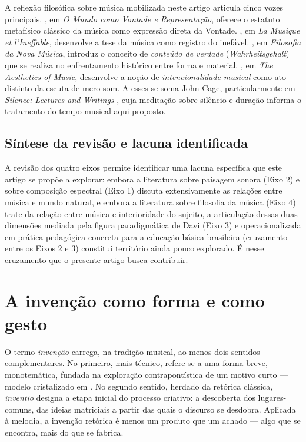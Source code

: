 \documentclass[12pt,a4paper]{article}
\begin{document}
A reflexão filosófica sobre música mobilizada neste artigo articula cinco vozes principais. \citet{Schopenhauer2005}, em \textit{O Mundo como Vontade e Representação}, oferece o estatuto metafísico clássico da música como expressão direta da Vontade. \citet{Jankelevitch1983}, em \textit{La Musique et l'Ineffable}, desenvolve a tese da música como registro do inefável. \citet{Adorno2018}, em \textit{Filosofia da Nova Música}, introduz o conceito de \textit{conteúdo de verdade} (\textit{Wahrheitsgehalt}) que se realiza no enfrentamento histórico entre forma e material. \citet{Scruton1997}, em \textit{The Aesthetics of Music}, desenvolve a noção de \textit{intencionalidade musical} como ato distinto da escuta de mero som. A esses se soma John Cage, particularmente em \textit{Silence: Lectures and Writings} \citep{Cage1961}, cuja meditação sobre silêncio e duração informa o tratamento do tempo musical aqui proposto.

\subsection{Síntese da revisão e lacuna identificada}

A revisão dos quatro eixos permite identificar uma lacuna específica que este artigo se propõe a explorar: embora a literatura sobre paisagem sonora (Eixo 2) e sobre composição espectral (Eixo 1) discuta extensivamente as relações entre música e mundo natural, e embora a literatura sobre filosofia da música (Eixo 4) trate da relação entre música e interioridade do sujeito, a articulação dessas duas dimensões mediada pela figura paradigmática de Davi (Eixo 3) e operacionalizada em prática pedagógica concreta para a educação básica brasileira (cruzamento entre os Eixos 2 e 3) constitui território ainda pouco explorado. É nesse cruzamento que o presente artigo busca contribuir.

\section{A invenção como forma e como gesto}

O termo \textit{invenção} carrega, na tradição musical, ao menos dois sentidos complementares. No primeiro, mais técnico, refere-se a uma forma breve, monotemática, fundada na exploração contrapontística de um motivo curto --- modelo cristalizado em \citet{Bach1723}. No segundo sentido, herdado da retórica clássica, \textit{inventio} designa a etapa inicial do processo criativo: a descoberta dos lugares-comuns, das ideias matriciais a partir das quais o discurso se desdobra. Aplicada à melodia, a invenção retórica é menos um produto que um achado --- algo que se encontra, mais do que se fabrica.
\end{document}

